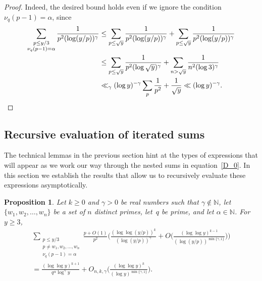 \documentclass[12pt,reqno]{amsart}
\newtheorem{proposition}[theorem]{Proposition}
\theoremstyle{definition}
\newcommand{\N}{{\mathbb N}}
\begin{document}
\begin{proof}
Indeed, the desired bound holds even if we ignore the condition $\nu_q(p-1)=\alpha$, since
\begin{align*}
\sum_{\substack{p\le y/3\\ \nu_q(p-1)=\alpha}} \frac1{p^2(\log(y/p))^\gamma} &\le \sum_{p\le\sqrt y} \frac1{p^2(\log(y/p))^\gamma} + \sum_{p\le\sqrt y} \frac1{p^2(\log(y/p))^\gamma} \\
&\le \sum_{p\le \sqrt y} \frac1{p^2(\log\sqrt y)^\gamma} + \sum_{n>\sqrt y} \frac1{n^2(\log3)^\gamma} \\
&\ll_\gamma (\log y)^{-\gamma} \sum_p \frac1{p^2} + \frac1{\sqrt y} \ll (\log y)^{-\gamma}.
\qedhere
\end{align*}
\end{proof}


\subsection{Recursive evaluation of iterated sums}

The technical lemmas in the previous section hint at the types of expressions that will appear as we work our way through the nested sums in equation~\eqref{D_0}. In this section we establish the results that allow us to recursively evaluate these expressions asymptotically.

\begin{proposition} \label{recsum}
Let $k\ge0$ and $\gamma>0$ be real numbers such that $\gamma\not\in\N$, let $\{w_1,w_2,\ldots,w_n\}$ be a set of $n$ distinct primes, let~$q$ be prime, and let $\alpha\in\N$. For $y\ge 3$,
\begin{multline}
\sum_{\substack{p\le y/3\\ p\ne w_1,w_2,\ldots, w_n \\ \nu_q(p-1)=\alpha}} \frac{p+O(1)}{p^2} \bigg(\frac{(\log\log(y/p))^k}{(\log(y/p))^\gamma}+O\bigg( \frac {(\log\log y)^{k-1}}{(\log(y/p))^{\min\{\gamma,1\}}}\bigg) \bigg)\\
=\frac{(\log\log y)^{k+1}}{q^\alpha\log^\gamma{y}}+O_{n,k,\gamma} \bigg( \frac{(\log\log y)^k}{(\log y)^{\min\{\gamma,1\}}} \bigg).
\label{recsum eq}
\end{multline}
\end{proposition}
\end{document}
